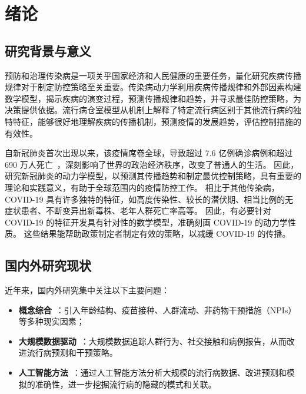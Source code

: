 \chapter{绪论} \label{ch:introduction}


\section{研究背景与意义}

预防和治理传染病是一项关乎国家经济和人民健康的重要任务，量化研究疾病传播规律对于制定防控策略至关重要。传染病动力学利用疾病传播规律和外部因素构建数学模型，揭示疾病的演变过程，预测传播规律和趋势，并寻求最佳防控策略，为决策提供依据。流行病仓室模型从机制上解释了特定流行病区别于其他流行病的独特特征，能够很好地理解疾病的传播机制，预测疫情的发展趋势，评估控制措施的有效性。

自新冠肺炎首次出现以来，该疫情席卷全球，导致超过 \num{7.6} 亿例确诊病例和超过 \num{690} 万人死亡~\cite{Data_WHO}，深刻影响了世界的政治经济秩序，改变了普通人的生活。
因此，研究新冠肺炎的动力学模型，以预测其传播趋势和制定最优控制策略，具有重要的理论和实践意义，有助于全球范围内的疫情防控工作。
相比于其他传染病， COVID-19 具有许多独特的特征，如高度传染性、较长的潜伏期、相当比例的无症状患者、不断变异出新毒株、老年人群死亡率高等。
因此，有必要针对 COVID-19 的特征开发具有针对性的数学模型，准确刻画 COVID-19 的动力学性质。
这些结果能帮助政策制定者制定有效的策略，以减缓 COVID-19 的传播。


\section{国内外研究现状}

近年来，国内外研究集中关注以下主要问题：

\begin{itemize}
	\item \textbf{概念综合}~\cite{Age-structured1,Age-structured2,Age-structured3,vaccination1,vaccination2,ZhouBMC2023,Wei2023IDM}：引入年龄结构、疫苗接种、人群流动、非药物干预措施（NPIs）等多种现实因素；
	\item \textbf{大规模数据驱动}~\cite{Shaier2022arXiv,Faith2021medRxiv,Zisad2021Algorithms}：大规模数据追踪人群行为、社交接触和病例报告，从而改进流行病预测和干预策略。
	\item \textbf{人工智能方法}~\cite{Tang2022AAM,Li2021CJE,Zain2021JCSE,Yang2020JTD}：通过人工智能方法分析大规模的流行病数据、改进预测和模拟的准确性，进一步挖掘流行病的隐藏的模式和关联。
\end{itemize}

